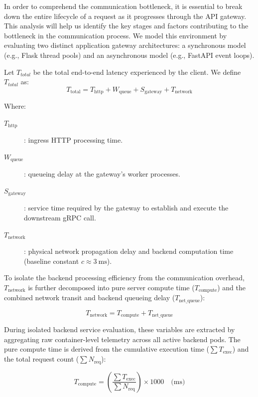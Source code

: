 \documentclass{ieeeaccess}
\begin{document}
In order to comprehend the communication bottleneck, it is essential to break down the entire lifecycle of a request as it progresses through the API gateway. This analysis will help us identify the key stages and factors contributing to the bottleneck in the communication process. We model this environment by evaluating two distinct application gateway architectures: a synchronous model \cite{gunicorn} (e.g., Flask thread pools) and an asynchronous model \cite{uvicorn} (e.g., FastAPI event loops).

Let $T_{total}$ be the total end-to-end latency experienced by the client. We define $T_{total}$ as:
\begin{equation}
    T_{\text{total}} = T_{\text{http}} + W_{\text{queue}} + S_{\text{gateway}} + T_{\text{network}}
\end{equation}

Where:
\begin{description}
  \item[$T_{\text{http}}$]    : ingress HTTP processing time.
  \item[$W_{\text{queue}}$]   : queueing delay at the gateway's worker processes.
  \item[$S_{\text{gateway}}$] : service time required by the gateway to establish and execute the downstream gRPC call.
  \item[$T_{\text{network}}$] : physical network propagation delay and backend computation time (baseline constant $c \approx 3\ \text{ms}$).
\end{description}

To isolate the backend processing efficiency from the communication overhead, $T_{\text{network}}$ is further decomposed into pure server compute time ($T_{\text{compute}}$) and the combined network transit and backend queueing delay ($T_{\text{net\_queue}}$):

\begin{equation}
	T_{\text{network}} = T_{\text{compute}} + T_{\text{net\_queue}}
\end{equation}

During isolated backend service evaluation, these variables are extracted by aggregating raw container-level telemetry across all active backend pods. The pure compute time is derived from the cumulative execution time ($\sum T_{\text{exec}}$) and the total request count ($\sum N_{\text{req}}$):

\begin{equation}
	\label{eq:t-comp}
	T_{\text{compute}} = \left( \frac{\sum T_{\text{exec}}}{\sum N_{\text{req}}} \right) \times 1000 \quad \text{(ms)}
\end{equation}
\end{document}
